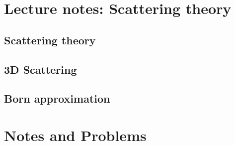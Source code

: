 \part{Lecture notes: Scattering theory}
   \chapter{Scattering theory}
      
      
   \chapter{3D Scattering}
      
      
   \chapter{Born approximation}
      

\part{Notes and Problems}
   
   
   
   
   
   
   
   
   
   
   
   
   
   
   
   
